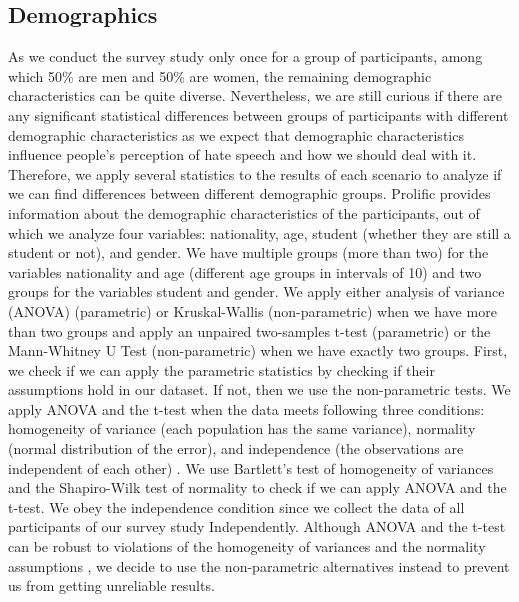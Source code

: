 \subsection{Demographics}
\label{sec:analysis-demographic}
As we conduct the survey study only once for a group of participants, among which 50\% are men and 50\% are women, the remaining demographic characteristics can be quite diverse.
%
Nevertheless, we are still curious if there are any significant statistical differences between groups of participants with different demographic characteristics as we expect that demographic characteristics influence people's perception of hate speech and how we should deal with it.
%
Therefore, we apply several statistics to the results of each scenario to analyze if we can find differences between different demographic groups.
%
Prolific provides information about the demographic characteristics of the participants, out of which we analyze four variables: nationality, age, student (whether they are still a student or not), and gender.
%
We have multiple groups (more than two) for the variables nationality and age (different age groups in intervals of 10) and two groups for the variables student and gender.
%
We apply either analysis of variance (ANOVA) (parametric) or Kruskal-Wallis (non-parametric) when we have more than two groups and apply an unpaired two-samples t-test (parametric) or the Mann-Whitney U Test (non-parametric) when we have exactly two groups.
%
First, we check if we can apply the parametric statistics by checking if their assumptions hold in our dataset.
%
If not, then we use the non-parametric tests.
%
We apply ANOVA and the t-test when the data meets following three conditions: homogeneity of variance (each population has the same variance), normality (normal distribution of the error), and independence (the observations are independent of each other) \citep{howell2012statistical}.
%
We use Bartlett's test of homogeneity of variances and the Shapiro-Wilk test of normality to check if we can apply ANOVA and the t-test.
%
We obey the independence condition since we collect the data of all participants of our survey study Independently.
%
Although ANOVA and the t-test can be robust to violations of the homogeneity of variances and the normality assumptions \citep{howell2012statistical}, we decide to use the non-parametric alternatives instead to prevent us from getting unreliable results.